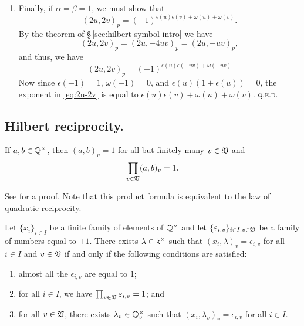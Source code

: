 \begin{enumerate}[nosep, label=(\roman*), wide]
    \item Finally, if \(\alpha = \beta = 1\), we must show that
    \[
    (2u, 2v)_p = (-1)^{\epsilon(u)\epsilon(v) + \omega(u) + \omega(v)}.
    \]
    By the theorem of \S\,\ref{sec:hilbert-symbol-intro} we have
    \[
    (2u, 2v)_p = (2u, -4uv)_p = (2u, -uv)_p,
    \]
    and thus, we have
    \begin{equation}
    (2u, 2v)_p = (-1)^{\epsilon(u)\epsilon(-uv) + \omega(-uv)}
    \label{eq:2u-2v}
    \end{equation}
    Now since \(\epsilon(-1) = 1\), \(\omega(-1) = 0\), and \(\epsilon(u) (1 + \epsilon(u)) = 0\), the exponent in \eqref{eq:2u-2v} is equal to \(\epsilon(u)\epsilon(v) + \omega(u) + \omega(v)\). \scshape{q.e.d.}
\end{enumerate}




\subsection{Hilbert reciprocity.}\label{sec:hilbert-reciprocity}

\begin{theoremx}
    If \(a, b \in \mathbb{Q}^{\times}\), then \((a, b)_v = 1\) for all but finitely many \(v \in \mathfrak{V}\) and 
    \[
        \prod_{v \in \mathfrak{V}} (a, b)_v = 1.
    \]
\end{theoremx}

See \cite[pp.~23--24]{serre2012course} for a proof. Note that this product formula is equivalent to the law of quadratic reciprocity.

\begin{theoremx}\label{thm:global-properties-hs}
    Let \(\{x_i\}_{i \in I}\) be a finite family of elements of \(\mathbb{Q}^{\times}\) and let \(\{\varepsilon_{i, v}\}_{i \in I, v \in \mathfrak{V}}\) be a family of numbers equal to \(\pm 1\). There exists \(\lambda \in \mathsf{k}^{\times}\) such that \((x_i, \lambda)_v = \epsilon_{i, v}\) for all \(i \in I\) and \(v \in \mathfrak{V}\) if and only if the following conditions are satisfied:

    \smallskip

    \begin{enumerate}[nosep, label=(\alph*)]
        \item almost all the \(\epsilon_{i, v}\) are equal to \(1\);
        \item for all \(i \in I\), we have \(\prod_{v \in \mathfrak{V}} \varepsilon_{i, v} = 1\); and
        \item for all \(v \in \mathfrak{V}\), there exists \(\lambda_v \in \mathbb{Q}_v^{\times}\) such that \((x_i, \lambda_v)_v = \epsilon_{i, v}\) for all \(i \in I\).
    \end{enumerate}
\end{theoremx}

